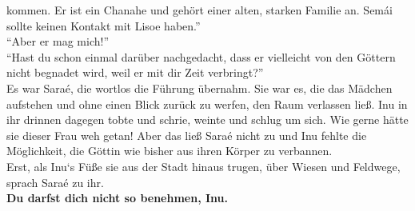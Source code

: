 kommen. Er ist ein Chanahe und gehört einer alten, starken Familie an. Semái sollte keinen Kontakt 
mit Lisoe haben.''\\
``Aber er mag mich!''\\
``Hast du schon einmal darüber nachgedacht, dass er vielleicht von den Göttern nicht begnadet wird, 
weil er mit dir Zeit verbringt?''\\
Es war Saraé, die wortlos die Führung übernahm. Sie war es, die das Mädchen aufstehen und ohne 
einen Blick zurück zu werfen, den Raum verlassen ließ. Inu in ihr drinnen dagegen tobte und schrie, 
weinte und schlug um sich. Wie gerne hätte sie dieser Frau weh getan! Aber das ließ Saraé nicht zu 
und Inu fehlte die Möglichkeit, die Göttin wie bisher aus ihren Körper zu verbannen. \\
Erst, als Inu‘s Füße sie aus der Stadt hinaus trugen, über Wiesen und Feldwege, sprach Saraé zu 
ihr.\\
\textbf{Du darfst dich nicht so benehmen, Inu.}\\

